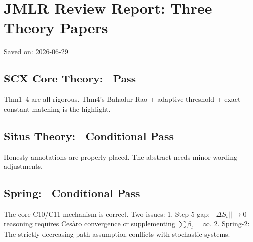 \documentclass[
  12pt,
]{article}
\author{SCX}
\date{2026}
\begin{document}
\section{JMLR Review Report: Three Theory Papers}\label{jmlr-review-report-three-theory-papers}

Saved on: 2026-06-29

\subsection{SCX Core Theory: \checkmark\ Pass}\label{scx-core-theory-pass}

Thm1--4 are all rigorous. Thm4's Bahadur-Rao + adaptive threshold + exact constant matching is the highlight.

\subsection{Situs Theory: \warning\ Conditional Pass}\label{situs-theory-conditional-pass}

Honesty annotations are properly placed. The abstract needs minor wording adjustments.

\subsection{Spring: \warning\ Conditional Pass}\label{spring-conditional-pass}

The core C10/C11 mechanism is correct. Two issues:
1. Step 5 gap: $||\Delta S_t||\to 0$ reasoning requires Ces\`{a}ro convergence or supplementing $\sum\beta_t=\infty$.
2. Spring-2: The strictly decreasing path assumption conflicts with stochastic systems.
\end{document}
